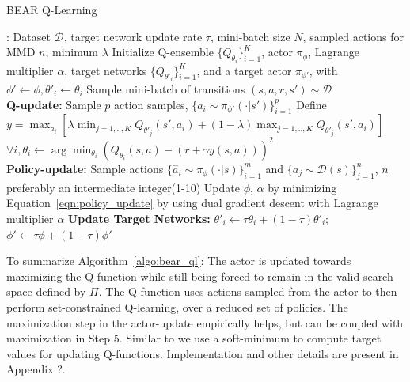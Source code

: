 \begin{algorithm}[H]

\small
\caption{BEAR Q-Learning}
\label{alg:q_learning}
\begin{algorithmic}[1]
    \INPUT: Dataset $\mathcal{D}$, target network update rate $\tau$, mini-batch size $N$, sampled actions for MMD $n$, minimum $\lambda$
    \STATE Initialize Q-ensemble $\{Q_{\theta_i} \}_{i=1}^{K}$, actor $\pi_{\phi}$, Lagrange multiplier $\alpha$, target networks $\{ Q_{\theta'_i} \}_{i=1}^K$, and a target actor $\pi_{\phi'}$, with $\phi' \leftarrow \phi, \theta'_i \leftarrow \theta_i$
        \STATE Sample mini-batch of transitions $(s, a, r, s') \sim \mathcal{D}$\\
        \textbf{Q-update:}
            \STATE Sample $p$ action samples, $\{a_i \sim \pi_{\phi'}(\cdot|s')\}_{i=1}^p$
            \STATE Define $y = \max_{a_i} [ \lambda \min_{j=1,..,K} Q_{\theta'_j}(s', a_i) + (1 - \lambda) \max_{j=1,..,K} Q_{\theta'_j}(s', a_i)]$
            \STATE $\forall i, \theta_i \leftarrow \arg \min_{\theta_i} (Q_{\theta_i}(s, a) - (r + \gamma y(s, a)))^2$\\
        \textbf{Policy-update:}
        \STATE Sample actions $\{ \hat{a}_i \sim \pi_{\phi}(\cdot | s) \}_{i=1}^{m}$ and $\{ a_j \sim \mathcal{D}(s)\}_{j=1}^{n}$, $n$ preferably an intermediate integer(1-10)
        \STATE Update $\phi$, $\alpha$ by minimizing Equation~\ref{eqn:policy_update} by using dual gradient descent with Lagrange multiplier $\alpha$
        \STATE \textbf{Update Target Networks: } $\theta'_i \leftarrow \tau \theta_i + (1 - \tau)\theta'_i$; $\phi' \leftarrow \tau \phi + (1 -\tau) \phi'$ 
    \ENDFOR
\end{algorithmic}
\label{algo:bear_ql}
\end{algorithm}

To summarize Algorithm~\ref{algo:bear_ql}: The actor is updated towards maximizing the Q-function while still being forced to remain in the valid search space defined by $\Pi$. The Q-function uses actions sampled from the actor to then perform set-constrained Q-learning, over a reduced set of policies. The maximization step in the actor-update empirically helps, but can be coupled with maximization in Step 5. Similar to \cite{fujimoto2018off} we use a soft-minimum to compute target values for updating Q-functions. Implementation and other details are present in Appendix ?.

